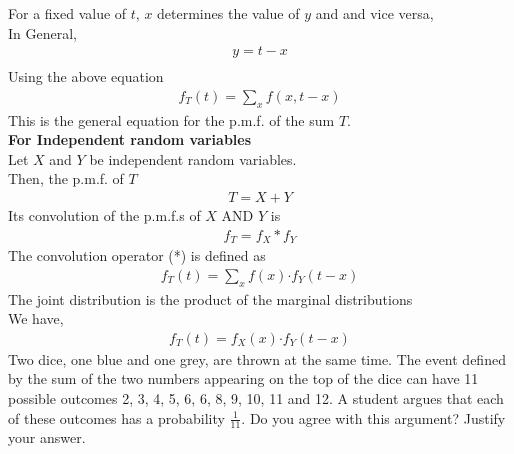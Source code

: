 \documentclass[journal,15pt,twocolumn]{IEEEtran}
\begin{document}
For a fixed value of $t$, $x$ determines the value of $y$ and and vice versa,\\
In General,
\begin{align}
    y=t-x\\
\end{align}
Using the above equation 
\begin{align}
f_T(t)= \sum_{x}^{}f(x,t-x)
\end{align}
This is the general equation for the p.m.f. of the sum $T$. \\ \vspace{2mm}
\textbf{For Independent random variables}\\
Let $X$ and $Y$ be independent random variables.\\
Then, the p.m.f. of $T$ 
\begin{align}
    T=X+Y
\end{align}
 Its convolution of the p.m.f.s of $X$ AND $Y$ is
\begin{align}
 f_T=f_X*f_Y
\end{align}
The convolution operator (*) is defined as
\begin{align}
    f_T(t)= \sum_{x}^{}f(x) \mathord{\cdot} f_Y(t-x)
\end{align}
 The joint distribution is the product of the marginal distributions \\
 We have,
 \begin{align}
    f_T(t)= f_X(x)\mathord{\cdot} f_Y(t-x)
\end{align}
Two dice, one blue and one grey, are thrown at the same time.   The event defined by the sum of the two numbers appearing on the top of the dice can have 11 possible outcomes 2, 3, 4, 5, 6, 6, 8, 9, 10, 11 and 12.  A student argues that each of these outcomes has a probability $\frac{1}{11}$.  Do you agree with this argument?  Justify your answer.
%
\end{document}
